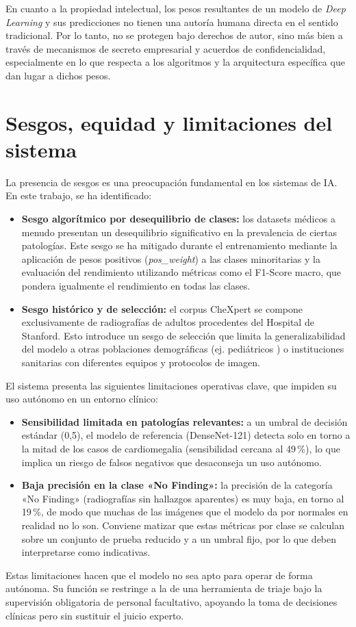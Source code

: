 En cuanto a la propiedad intelectual, los pesos resultantes de un modelo de \textit{Deep Learning} y sus predicciones no tienen una autoría humana directa en el sentido tradicional. Por lo tanto, no se protegen bajo derechos de autor, sino más bien a través de mecanismos de secreto empresarial y acuerdos de confidencialidad, especialmente en lo que respecta a los algoritmos y la arquitectura específica que dan lugar a dichos pesos.

\section{Sesgos, equidad y limitaciones del sistema}
La presencia de sesgos es una preocupación fundamental en los sistemas de IA. En este trabajo, se ha identificado:
\begin{itemize}
    \item \textbf{Sesgo algorítmico por desequilibrio de clases:} los datasets médicos a menudo presentan un desequilibrio significativo en la prevalencia de ciertas patologías. Este sesgo se ha mitigado durante el entrenamiento mediante la aplicación de pesos positivos (\textit{pos\_weight}) a las clases minoritarias y la evaluación del rendimiento utilizando métricas como el F1-Score macro, que pondera igualmente el rendimiento en todas las clases.
    \item \textbf{Sesgo histórico y de selección:} el corpus CheXpert \cite{irvinCheXpertLargeChest2019} se compone exclusivamente de radiografías de adultos procedentes del Hospital de Stanford. Esto introduce un sesgo de selección que limita la generalizabilidad del modelo a otras poblaciones demográficas (ej. pediátricos \cite{lizEnsemblesConvolutional2021}) o instituciones sanitarias con diferentes equipos y protocolos de imagen.
\end{itemize}
El sistema presenta las siguientes limitaciones operativas clave, que impiden su uso autónomo en un entorno clínico:
\begin{itemize}
    \item \textbf{Sensibilidad limitada en patologías relevantes:} a un umbral de decisión estándar (0,5), el modelo de referencia (DenseNet-121) detecta solo en torno a la mitad de los casos de cardiomegalia (sensibilidad cercana al 49\,\%), lo que implica un riesgo de falsos negativos que desaconseja un uso autónomo.
    \item \textbf{Baja precisión en la clase «No Finding»:} la precisión de la categoría «No Finding» (radiografías sin hallazgos aparentes) es muy baja, en torno al 19\,\%, de modo que muchas de las imágenes que el modelo da por normales en realidad no lo son. Conviene matizar que estas métricas por clase se calculan sobre un conjunto de prueba reducido y a un umbral fijo, por lo que deben interpretarse como indicativas.
\end{itemize}
Estas limitaciones hacen que el modelo no sea apto para operar de forma autónoma. Su función se restringe a la de una herramienta de triaje bajo la supervisión obligatoria de personal facultativo, apoyando la toma de decisiones clínicas pero sin sustituir el juicio experto.

